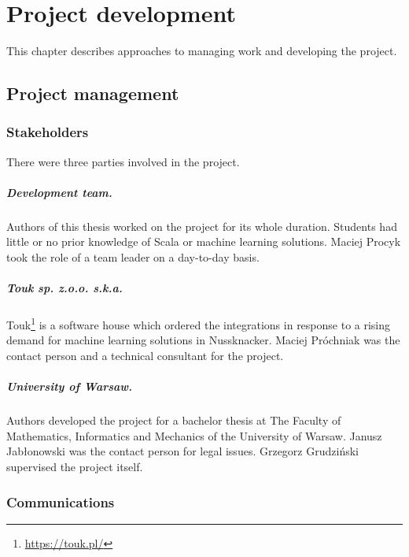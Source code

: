 \chapter{Project development}
\label{chap:project-development}

This chapter describes approaches to managing work and developing the project.

\section{Project management}

\subsection{Stakeholders}

There were three parties involved in the project.

\paragraph{Development team.}
Authors of this thesis worked on the project for its whole duration.
Students had little or no prior knowledge of Scala or machine learning solutions.
Maciej Procyk took the role of a team leader on a day-to-day basis.

\paragraph{Touk sp. z.o.o. s.k.a.}
Touk\footnote{\href{https://touk.pl/}{https://touk.pl/}} is a software house which ordered the integrations in response to a rising demand for machine learning solutions in Nussknacker.
Maciej Próchniak was the contact person and a technical consultant for the project.

\paragraph{University of Warsaw.}
Authors developed the project for a bachelor thesis at The Faculty of Mathematics, Informatics and Mechanics of the University of Warsaw.
Janusz Jabłonowski was the contact person for legal issues.
Grzegorz Grudziński supervised the project itself.

\subsection{Communications}

